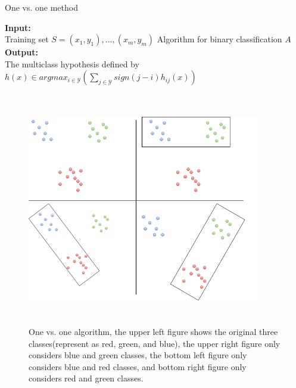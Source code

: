 \begin{algorithm}[H]
	\caption{One vs. one method}\label{alg:onevsone}
	\nl \textbf{Input:}\\
	\nl Training set $S=(x_1, y_1), ..., (x_m, y_m)$\;
	Algorithm for binary classification $A$\;
	\nl {}
	\nl	\textbf{Output:}\\
	\nl	The multiclass hypothesis defined by 
	$h(x) \in argmax_{i \in \mathcal{Y}}(\sum_{j\in \mathcal{Y}}sign(j-i)h_{ij}(x))$ \;
	
\end{algorithm} 


\begin{figure} [hp]
	\begin{center}
		\includegraphics[width=4in,  height=4in]{figures/onevsone.png}
	\end{center}
	\caption{One vs. one algorithm,  the upper left figure shows the original three classes(represent as red,  green,  and blue),  the upper right figure only considers blue and green classes,  the bottom left figure only considers blue and red classes,  and bottom right figure only considers red and green classes. } \label{fig:onevsone}
\end{figure}

